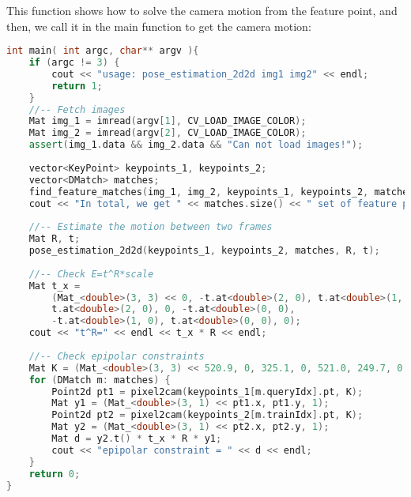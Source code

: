 This function shows how to solve the camera motion from the feature point, and then, we call it in the main function to get the camera motion:
\begin{lstlisting}[language=c++,caption=slambook2/ch7/pose_estimation_2d2d.cpp （片段）]
int main( int argc, char** argv ){
    if (argc != 3) {
        cout << "usage: pose_estimation_2d2d img1 img2" << endl;
        return 1;
    }
    //-- Fetch images
    Mat img_1 = imread(argv[1], CV_LOAD_IMAGE_COLOR);
    Mat img_2 = imread(argv[2], CV_LOAD_IMAGE_COLOR);
    assert(img_1.data && img_2.data && "Can not load images!");
    
    vector<KeyPoint> keypoints_1, keypoints_2;
    vector<DMatch> matches;
    find_feature_matches(img_1, img_2, keypoints_1, keypoints_2, matches);
    cout << "In total, we get " << matches.size() << " set of feature points" << endl;
    
    //-- Estimate the motion between two frames
    Mat R, t;
    pose_estimation_2d2d(keypoints_1, keypoints_2, matches, R, t);
    
    //-- Check E=t^R*scale
    Mat t_x =
        (Mat_<double>(3, 3) << 0, -t.at<double>(2, 0), t.at<double>(1, 0),
        t.at<double>(2, 0), 0, -t.at<double>(0, 0),
        -t.at<double>(1, 0), t.at<double>(0, 0), 0);
    cout << "t^R=" << endl << t_x * R << endl;
    
    //-- Check epipolar constraints
    Mat K = (Mat_<double>(3, 3) << 520.9, 0, 325.1, 0, 521.0, 249.7, 0, 0, 1);
    for (DMatch m: matches) {
        Point2d pt1 = pixel2cam(keypoints_1[m.queryIdx].pt, K);
        Mat y1 = (Mat_<double>(3, 1) << pt1.x, pt1.y, 1);
        Point2d pt2 = pixel2cam(keypoints_2[m.trainIdx].pt, K);
        Mat y2 = (Mat_<double>(3, 1) << pt2.x, pt2.y, 1);
        Mat d = y2.t() * t_x * R * y1;
        cout << "epipolar constraint = " << d << endl;
    }
    return 0;
}
\end{lstlisting}

